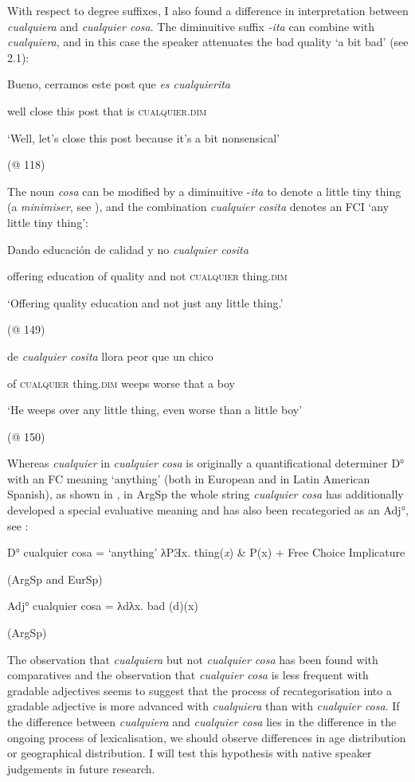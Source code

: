   With respect to degree suffixes, I also found a difference in interpretation between \textit{cualquiera} and \textit{cualquier cosa}. The diminuitive suffix \textit{-ita} can combine with \textit{cualquiera}, and in this case the speaker attenuates the bad quality ‘a bit bad’ (see 2.1):

    Bueno,  cerramos  este  post  que  \textit{es  cualquierita}

    well  close  this  post  that  is  \textsc{cualquier}.\textsc{dim}

    ‘Well, let’s close this post because it’s a bit nonsensical’

    (@ 118)

The noun \textit{cosa} can be modified by a diminuitive -\textit{ita} to denote a little tiny thing (a \textit{minimiser}, see \citealt{Krifka1995}), and the combination \textit{cualquier cosita} denotes an FCI ‘any little tiny thing’:

    Dando  educación  de  calidad  y  no  \textit{cualquier  cosita}

    offering  education  of  quality  and  not  \textsc{cualquier}  thing.\textsc{dim}

    ‘Offering quality education and not just any little thing.’

    (@ 149)

    de  \textit{cualquier  cosita} llora  peor  que  un  chico

    of  \textsc{cualquier}  thing.\textsc{dim}  weeps  worse  that  a  boy

    ‘He weeps over any little thing, even worse than a little boy’

    (@ 150)

Whereas \textit{cualquier} in \textit{cualquier cosa} is originally a quantificational determiner D° with an FC meaning ‘anything’ (both in European and in Latin American Spanish), as shown in , in ArgSp the whole string \textit{cualquier cosa} has additionally developed a special evaluative meaning and has also been recategoried as an Adj°, see :

\label{bkm:Ref150787837}    D° cualquier cosa = ‘anything’ λPƎx. thing(\textit{x}) \& P(x) + Free Choice Implicature

    (ArgSp and EurSp) 

\label{bkm:Ref150787813}    Adj° cualquier cosa = λdλx. bad (d)(x)

    (ArgSp) 

The observation that \textit{cualquiera} but not \textit{cualquier cosa} has been found with comparatives and the observation that \textit{cualquier cosa} is less frequent with gradable adjectives seems to suggest that the process of recategorisation into a gradable adjective is more advanced with \textit{cualquiera} than with \textit{cualquier cosa}. If the difference between \textit{cualquiera} and \textit{cualquier cosa} lies in the difference in the ongoing process of lexicalisation, we should observe differences in age distribution or geographical distribution. I will test this hypothesis with native speaker judgements in future research. 

